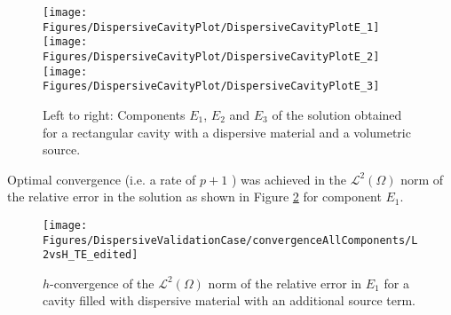 \documentclass[times,11pt]{ACME2015article}
\begin{document}
\begin{figure}[htbp!]
 \centering
 \texttt{[image: Figures/DispersiveCavityPlot/DispersiveCavityPlotE\_1]}
 \texttt{[image: Figures/DispersiveCavityPlot/DispersiveCavityPlotE\_2]}
 \texttt{[image: Figures/DispersiveCavityPlot/DispersiveCavityPlotE\_3]}
 \caption{Left to right: Components $E_1$, $E_2$ and $E_3$ of the solution obtained for a rectangular cavity with a dispersive material and a volumetric source.}
 \label{dipersive-solution}
\end{figure}

Optimal convergence (i.e. a rate of $p + 1$ ) was achieved in the $\mathcal{L}^2(\Omega)$ norm of the relative error in the solution as shown in Figure \ref{dispersive-cavity-error} for component $E_1$.

\begin{figure}[htbp!]
 \centering
 \texttt{[image: Figures/DispersiveValidationCase/convergenceAllComponents/L2vsH\_TE\_edited]}
 \caption{$h$-convergence of the $\mathcal{L}^2(\Omega)$ norm of the relative error in $E_1$ for a cavity filled with dispersive material with an additional source term.}
 \label{dispersive-cavity-error}
\end{figure}






\end{document}
